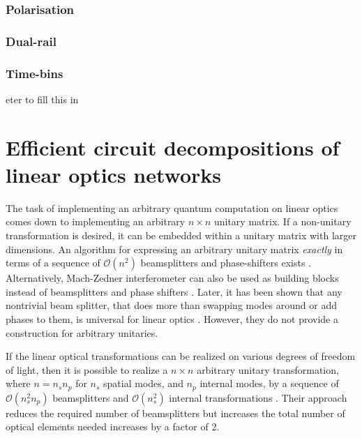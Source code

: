 \documentclass[aps,rmp,twocolumn,amsmath,amssymb,nofootinbib,superscriptaddress]{revtex4}
\newcommand{\sihui}[1]{{\color{Orchid}{#1}}}
\begin{document}
\subsubsection{Polarisation}

\subsubsection{Dual-rail}

\subsubsection{Time-bins}

{\sihui Peter to fill this in}



\section{Efficient circuit decompositions of linear optics networks}

The task of implementing an arbitrary quantum computation on linear optics comes down to implementing an arbitrary $n\times n$ unitary matrix. If a non-unitary transformation is desired, it can be embedded within a unitary matrix with larger dimensions. An algorithm for expressing an arbitrary unitary matrix {\it exactly} in terms of a sequence of $\mathcal{O}(n^2)$ beamsplitters and phase-shifters exists \cite{bib:Reck1994}. Alternatively, Mach-Zedner interferometer can also be used as building blocks instead of beamsplitters and phase shifters \cite{bib:Reck1994, bib:Englert2001}. Later, it has been shown that any nontrivial beam splitter, that does more than swapping modes around or add phases to them, is universal for linear optics \cite{bib:Bouland2014}. However, they do not provide a construction for arbitrary unitaries.

If the linear optical transformations can be realized on various degrees of freedom of light, then it is possible to realize a $n\times n$ arbitrary unitary transformation, where $n=n_s n_p$ for $n_s$ spatial modes, and $n_p$ internal modes, by a sequence of $\mathcal{O}(n_s^2 n_p)$ beamsplitters and $\mathcal{O}(n_s^2)$ internal transformations \cite{bib:Dhand2015}. Their approach reduces the required number of beamsplitters but increases the total number of optical elements needed increases by a factor of 2.
\end{document}
